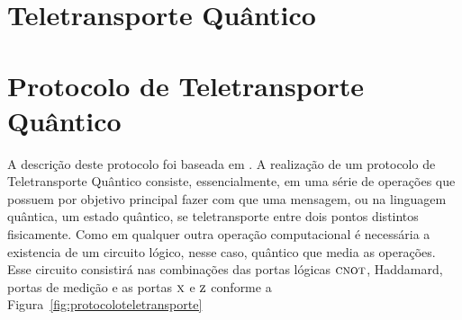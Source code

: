 \section{Teletransporte Quântico}
%
%
%


\section{Protocolo de Teletransporte Quântico}

A descrição deste protocolo foi baseada em \textcite{chuang, jorcuvich, CompInfoQuantica, benschu}. A realização de um protocolo de Teletransporte Quântico consiste, essencialmente, em uma série de operações que possuem por objetivo principal fazer com que uma mensagem, ou na linguagem quântica, um estado quântico, se teletransporte entre dois pontos distintos fisicamente.
Como em qualquer outra operação computacional é necessária a existencia de um circuito lógico, nesse caso, quântico que media as operações. Esse circuito consistirá nas combinações das portas lógicas \(\operatorname{\textsc{cnot}}\), Haddamard, portas de medição e as portas \(\operatorname{\textsc{x}}\) e \(\operatorname{\textsc{z}}\) conforme a Figura~\ref{fig:protocoloteletransporte}

